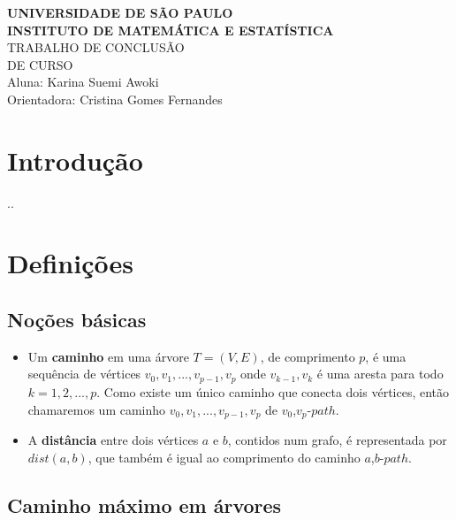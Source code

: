 \documentclass[a4paper,12pt]{article}
\begin{document}
\begin{center}
   {\large \textbf{UNIVERSIDADE DE SÃO PAULO}} \\[1.4cm]
   
   {\large \textbf{INSTITUTO DE MATEMÁTICA E ESTATÍSTICA}}\\[4.2cm]
   
   {\Huge TRABALHO DE CONCLUSÃO }\\[0.3cm]
   {\Huge DE CURSO }\\[9cm]
   
   {\large { Aluna: Karina Suemi Awoki}}\\[0.3cm]
   
   {\large { Orientadora: Cristina Gomes Fernandes}}
   

\end{center}

\newpage
\section{Introdução}
..
\bigskip

\section{Definições}

	\subsection{Noções básicas}
		\begin{itemize}
			\item Um \textbf{caminho} em uma árvore $T=(V,E)$, de 
	    	comprimento $p$, é uma sequência de vértices 
	    	$v_0, v_1, ...,v_{p-1}, v_p$ 
	    	onde {$v_{k-1}, v_k$} é uma aresta para todo 
	    	$k = 1,2,..., p$. 
	    	Como existe um único caminho que conecta dois vértices,
	    	então chamaremos um caminho 
	    	$v_0, v_1, ...,v_{p-1}, v_p$ de
	    	$v_0$,$v_p$-$path$.

			\item A \textbf{distância} entre dois vértices $a$ e 
			$b$, contidos num grafo, é representada por 
			$dist(a,b)$, que também é igual ao comprimento do
			caminho $a$,$b$-$path$.

		\end{itemize}

    \subsection{Caminho máximo em árvores}
\end{document}
